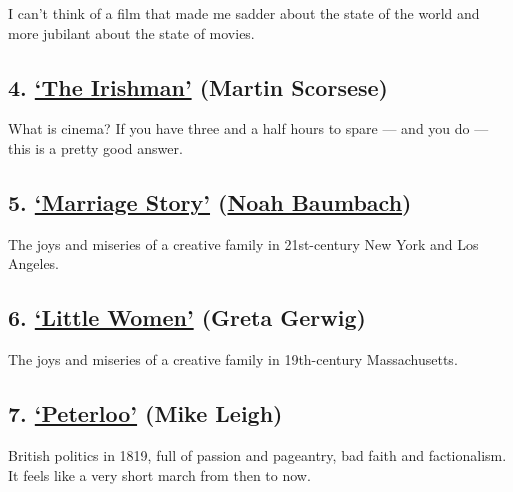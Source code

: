 I can't think of a film that made me sadder about the state of the world
and more jubilant about the state of movies.

\hypertarget{4-the-irishman-martin-scorsese}{%
\subsection{\texorpdfstring{4.
\href{https://www.nytimes.com/2019/09/27/movies/the-irishman-review.html}{`The
Irishman'} (Martin
Scorsese)}{4. `The Irishman' (Martin Scorsese)}}\label{4-the-irishman-martin-scorsese}}

What is cinema? If you have three and a half hours to spare --- and you
do --- this is a pretty good answer.

\hypertarget{5-marriage-story-noah-baumbach}{%
\subsection{\texorpdfstring{5.
\href{https://www.nytimes.com/2019/11/05/movies/marriage-story-review.html}{`Marriage
Story'}
(\href{https://www.nytimes.com/2019/11/27/movies/marriage-story-noah-baumbach.html}{Noah
Baumbach})}{5. `Marriage Story' (Noah Baumbach)}}\label{5-marriage-story-noah-baumbach}}

The joys and miseries of a creative family in 21st-century New York and
Los Angeles.

\hypertarget{6-little-women-greta-gerwig}{%
\subsection{\texorpdfstring{6.
\href{https://www.nytimes.com/2019/12/23/movies/little-women-review.html}{`Little
Women'} (Greta
Gerwig)}{6. `Little Women' (Greta Gerwig)}}\label{6-little-women-greta-gerwig}}

The joys and miseries of a creative family in 19th-century
Massachusetts.

\hypertarget{7-peterloo-mike-leigh}{%
\subsection{\texorpdfstring{7.
\href{https://www.nytimes.com/2019/04/04/movies/peterloo-review.html}{`Peterloo'}
(Mike Leigh)}{7. `Peterloo' (Mike Leigh)}}\label{7-peterloo-mike-leigh}}

British politics in 1819, full of passion and pageantry, bad faith and
factionalism. It feels like a very short march from then to now.

